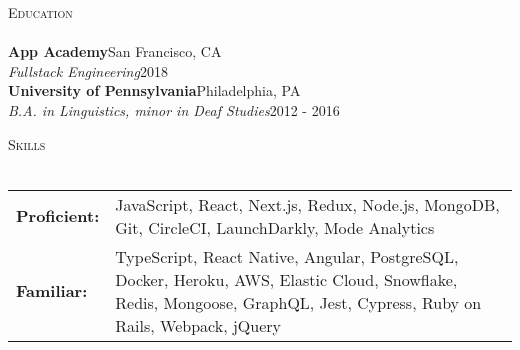 \documentclass[a4paper]{article}
\newcommand{\header}[1]{
    {\hspace*{-18pt}\vspace*{3pt} \textcolor{deeppurple}{\textsc{#1}}}
    \vspace*{-12pt} \\
    \hspace*{-18pt} \textcolor{deeppurple}{\hrulefill} \\
}
\begin{document}
\header{Education}
\textbf{App Academy}\hfill San Francisco, CA\\
\textit{Fullstack Engineering}\hfill 2018\\
\vspace{2mm}
\textbf{University of Pennsylvania}\hfill Philadelphia, PA\\
\textit{B.A. in Linguistics, minor in Deaf Studies}\hfill 2012 - 2016\\
\vspace{2mm}

\header{Skills}
\vspace{1mm}
\begin{tabular}{ l p{6in} }
    \hspace{-0.08in}\textbf{Proficient:} & JavaScript, React, Next.js, Redux, Node.js, MongoDB, Git, CircleCI, LaunchDarkly, Mode Analytics  \\
    \hspace{-0.08in}\textbf{Familiar:}   & TypeScript, React Native, Angular, PostgreSQL, Docker, Heroku, AWS, Elastic Cloud, Snowflake, Redis, Mongoose, GraphQL, Jest, Cypress, Ruby on Rails, Webpack, jQuery \\
\end{tabular}
\end{document}
